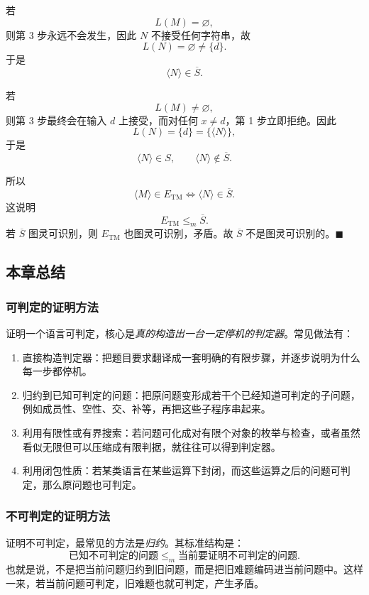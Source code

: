 \begin{answerred}
若
\[
L(M)=\varnothing,
\]
则第 3 步永远不会发生，因此 $N$ 不接受任何字符串，故
\[
L(N)=\varnothing\neq \{d\}.
\]
于是
\[
\langle N\rangle\in \overline{S}.
\]

若
\[
L(M)\neq\varnothing,
\]
则第 3 步最终会在输入 $d$ 上接受，而对任何 $x\neq d$，第 1 步立即拒绝。因此
\[
L(N)=\{d\}=\{\langle N\rangle\},
\]
于是
\[
\langle N\rangle\in S,
\qquad
\langle N\rangle\notin \overline{S}.
\]

所以
\[
\langle M\rangle\in E_{\mathrm{TM}}
\iff
\langle N\rangle\in \overline{S}.
\]
这说明
\[
E_{\mathrm{TM}}\le_m \overline{S}.
\]
若 $\overline{S}$ 图灵可识别，则 $E_{\mathrm{TM}}$ 也图灵可识别，矛盾。故 $\overline{S}$ 不是图灵可识别的。$\blacksquare$
\end{answerred}

\subsection*{本章总结}

\subsubsection*{可判定的证明方法}

证明一个语言可判定，核心是\emph{真的构造出一台一定停机的判定器}。常见做法有：

\begin{enumerate}[label=(\arabic*)]
  \item 直接构造判定器：把题目要求翻译成一套明确的有限步骤，并逐步说明为什么每一步都停机。
  \item 归约到已知可判定的问题：把原问题变形成若干个已经知道可判定的子问题，例如成员性、空性、交、补等，再把这些子程序串起来。
  \item 利用有限性或有界搜索：若问题可化成对有限个对象的枚举与检查，或者虽然看似无限但可以压缩成有限判据，就往往可以得到判定器。
  \item 利用闭包性质：若某类语言在某些运算下封闭，而这些运算之后的问题可判定，那么原问题也可判定。
\end{enumerate}

\subsubsection*{不可判定的证明方法}

证明不可判定，最常见的方法是\emph{归约}。其标准结构是：
\[
\text{已知不可判定的问题}
\le_m
\text{当前要证明不可判定的问题}.
\]
也就是说，不是把当前问题归约到旧问题，而是把旧难题编码进当前问题中。这样一来，若当前问题可判定，旧难题也就可判定，产生矛盾。

